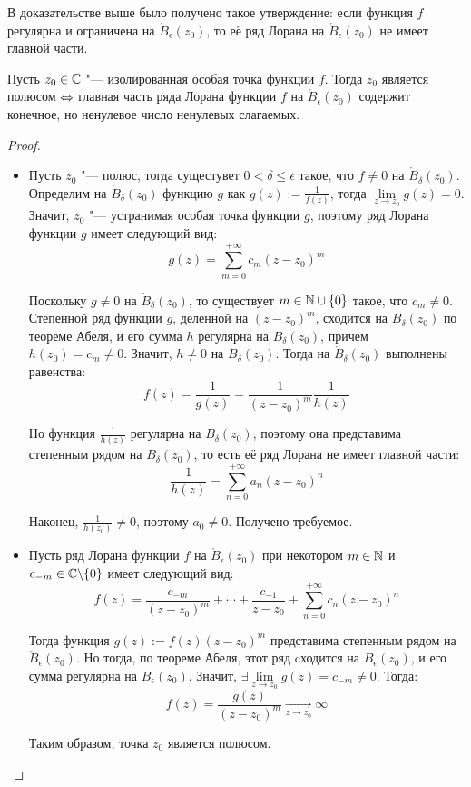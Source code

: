 \begin{note}
	В доказательстве выше было получено такое утверждение: если функция $f$ регулярна и ограничена на $\mathring B_\epsilon(z_0)$, то её ряд Лорана на $\mathring B_\epsilon(z_0)$ не имеет главной части.
\end{note}

\begin{proposition}
	Пусть $z_0 \in \mathbb{C}$ "--- изолированная особая точка функции $f$. Тогда $z_0$ является полюсом $\Leftrightarrow$ главная часть ряда Лорана функции $f$ на $\mathring B_\epsilon(z_0)$ содержит конечное, но ненулевое число ненулевых слагаемых.
\end{proposition}

\begin{proof}~
	\begin{itemize}
		\item[$\ra$]Пусть $z_0$ "--- полюс, тогда сущестувет $0 < \delta \le \epsilon$ такое, что $f \ne 0$ на $\mathring B_\delta(z_0)$. Определим на $\mathring B_\delta(z_0)$ функцию $g$ как $g(z) := \frac1{f(z)}$, тогда $\lim\limits_{z \to z_0}g(z) = 0$. Значит, $z_0$ "--- устранимая особая точка функции $g$, поэтому ряд Лорана функции $g$ имеет следующий вид:
		\[g(z) = \sum\limits_{m = 0}^{+\infty}c_m(z - z_0)^m\]
		
		Поскольку $g \ne 0$ на $\mathring B_\delta(z_0)$, то существует $m \in \mathbb{N} \cup \{0\}$ такое, что $c_m \ne 0$. Степенной ряд функции ${g}$, деленной на ${(z - z_0)^m}$, сходится на $B_\delta(z_0)$ по теореме Абеля, и его сумма $h$ регулярна на $B_\delta(z_0)$, причем $h(z_0) = c_m \ne 0$. Значит, $h \ne 0$ на $B_\delta(z_0)$. Тогда на $\mathring B_\delta(z_0)$ выполнены равенства:
		\[f(z) = \frac{1}{g(z)} = \frac1{(z - z_0)^m}\frac1{h(z)}\]
		
		Но функция $\frac1{h(z)}$ регулярна на $B_\delta(z_0)$, поэтому она представима степенным рядом на $B_\delta(z_0)$, то есть её ряд Лорана не имеет главной части:
		\[\frac{1}{h(z)} = \sum_{n=0}^{+\infty}a_n(z - z_0)^n\]
		
		Наконец, $\frac1{h(z_0)} \ne 0$, поэтому $a_0 \ne 0$. Получено требуемое.
		
		\item[$\la$] Пусть ряд Лорана функции $f$ на $\mathring B_\epsilon(z_0)$ при некотором $m \in \mathbb{N}$ и $c_{-m} \in \mathbb{C} \backslash \{0\}$ имеет следующий вид:
		\[f(z) = \frac{c_{-m}}{(z-z_0)^m} + \dotsb + \frac{c_{-1}}{z-z_0} + \sum_{n = 0}^{+\infty}c_n(z - z_0)^n\]
		
		Тогда функция $g(z) := f(z)(z-z_0)^m$ представима степенным рядом на $\mathring B_\epsilon(z_0)$. Но тогда, по теореме Абеля, этот ряд cходится на $B_\epsilon(z_0)$, и его сумма регулярна на $B_\epsilon(z_0)$. Значит, $\exists\lim\limits_{z \to z_0} g(z) = c_{-m} \ne 0$. Тогда:
		\[f(z) = \frac{g(z)}{(z - z_0)^m} \xrightarrow[z \to z_0]{} \infty\]
		
		Таким образом, точка $z_0$ является полюсом.\qedhere
	\end{itemize}
\end{proof}

